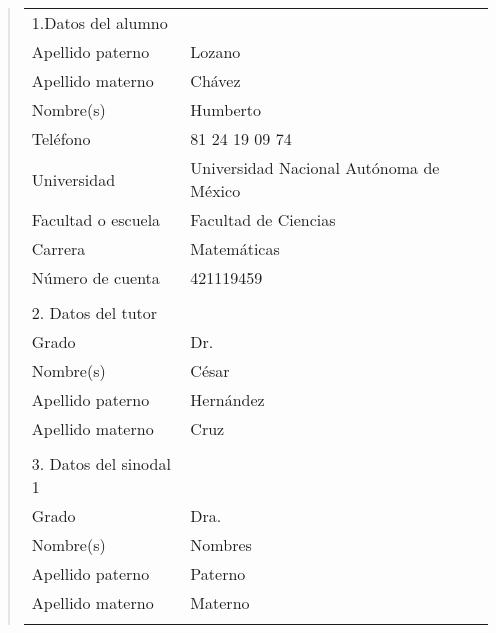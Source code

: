 {\small
\begin{quote}
\begin{tabular}{lll}
1.Datos del alumno          & {}                                          \\
Apellido paterno            & Lozano                                     \\
Apellido materno            & Chávez                                     \\
Nombre(s)                   & Humberto                                     \\
Tel\'efono                  & 81 24 19 09 74                              \\
Universidad                 & Universidad Nacional Aut\'onoma de M\'exico \\
Facultad o escuela          & Facultad de Ciencias                        \\
Carrera                     & Matemáticas                                     \\
N\'umero de cuenta          & 421119459                                   \\
{}                          & {}                                          \\
2. Datos del tutor          & {}                                          \\
Grado                       & Dr.                                         \\
Nombre(s)                   & C\'esar                                     \\
Apellido paterno            & Hern\'andez                                 \\
Apellido materno            & Cruz                                        \\
{}                          & {}                                          \\
3. Datos del sinodal 1      & {}                                          \\
Grado                       & Dra.                                        \\
Nombre(s)                   & Nombres                                     \\
Apellido paterno            & Paterno                                     \\
Apellido materno            & Materno                                     \\
{}                          & {}                                          \\

\end{tabular}
\end{quote}}
